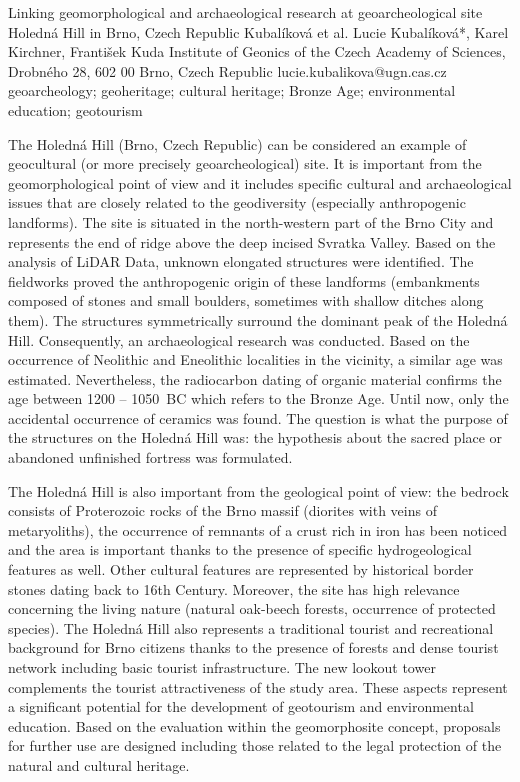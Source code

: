 \abstract
{Linking geomorphological and archaeological research at geoarcheological site Holedná Hill in Brno, Czech Republic} 
{Kubalíková et al.} 
{Lucie Kubalíková*, Karel Kirchner, František Kuda} 
{\POtag} 
{Institute of Geonics of the Czech Academy of Sciences, Drobného 28, 602 00 Brno, Czech Republic
}
{lucie.kubalikova@ugn.cas.cz}  %
{geoarcheology; geoheritage; cultural heritage; Bronze Age; environmental education; geotourism}
{The Holedná Hill (Brno, Czech Republic) can be considered an example of geocultural (or more precisely geoarcheological) site. It is important from the geomorphological point of view and it includes specific cultural and archaeological issues that are closely related to the geodiversity (especially anthropogenic landforms). The site is situated in the north-western part of the Brno City and represents the end of ridge above the deep incised Svratka Valley. Based on the analysis of LiDAR Data, unknown elongated structures were identified. The fieldworks proved the anthropogenic origin of these landforms (embankments composed of stones and small boulders, sometimes with shallow ditches along them). The structures symmetrically surround the dominant peak of the Holedná Hill. Consequently, an archaeological research was conducted. Based on the occurrence of Neolithic and Eneolithic localities in the vicinity, a similar age was estimated. Nevertheless, the radiocarbon dating of organic material confirms the age between 1200 -- 1050~BC which refers to the Bronze Age. Until now, only the accidental occurrence of ceramics was found. The question is what the purpose of the structures on the Holedná Hill was: the hypothesis about the sacred place or abandoned unfinished fortress was formulated.

The Holedná Hill is also important from the geological point of view: the bedrock consists of Proterozoic rocks of the Brno massif (diorites with veins of metaryoliths), the occurrence of remnants of a crust rich in iron has been noticed and the area is important thanks to the presence of specific hydrogeological features as well. Other cultural features are represented by historical border stones dating back to 16th Century. Moreover, the site has high relevance concerning the living nature (natural oak-beech forests, occurrence of protected species). The Holedná Hill also represents a traditional tourist and recreational background for Brno citizens thanks to the presence of forests and dense tourist network including basic tourist infrastructure. The new lookout tower complements the tourist attractiveness of the study area. These aspects represent a significant potential for the development of geotourism and environmental education. Based on the evaluation within the geomorphosite concept, proposals for further use are designed including those related to the legal protection of the natural and cultural heritage.
}

